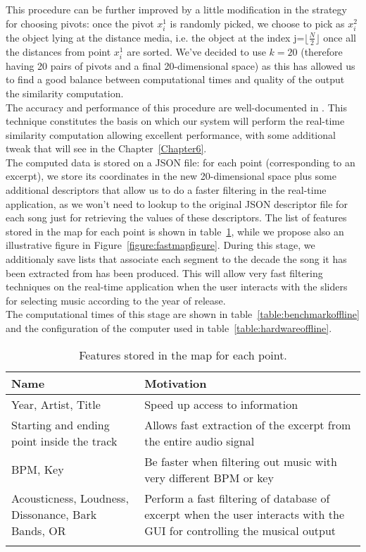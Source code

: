This procedure can be further improved by a little modification in the strategy for choosing pivots: once the pivot $x_i^1$ is randomly picked, we choose to pick as $x_i^2$ the object lying at the distance media, i.e. the object at the index j=$ \lfloor \frac{N}{2} \rfloor$ once all the distances from point $x_i^1$ are sorted. We've decided to use $k=20$ (therefore having 20 pairs of pivots and a final 20-dimensional space) as this has allowed us to find a good balance between computational times and quality of the output the similarity computation.\\
The accuracy and performance of this procedure are well-documented in \cite{fastmap12}. This technique constitutes the basis on which our system will perform the real-time similarity computation allowing excellent performance, with some additional tweak that will see in the Chapter~\ref{Chapter6}. \\
The computed data is stored on a JSON file: for each point (corresponding to an excerpt), we store its coordinates in the new 20-dimensional space plus some additional descriptors that allow us to do a faster filtering in the real-time application, as we won't need to lookup to the original JSON descriptor file for each song just for retrieving the values of these descriptors. The list of features stored in the map for each point is shown in table~\ref{table:fastmap}, while we propose also an illustrative figure in Figure~\ref{figure:fastmapfigure}. During this stage, we additionaly save lists that associate each segment to the decade the song it has been extracted from has been produced. This will allow very fast filtering techniques on the real-time application when the user interacts with the sliders for selecting music according to the year of release. \\The computational times of this stage are shown in table~\ref{table:benchmarkoffline} and the configuration of the computer used in table~\ref{table:hardwareoffline}.


\newpage
\begin{center}
\begin{longtable}{| p{} | p{} |} 
\hline
\textbf{Name} &  \textbf{Motivation} \\ \hline
Year, Artist, Title & Speed up access to information\\ \hline
Starting and ending point inside the track & Allows fast extraction of the excerpt from the entire audio signal \\ \hline
BPM, Key & Be faster when filtering out music with very different BPM or key\\ \hline
Acousticness, Loudness, Dissonance, Bark Bands, OR & Perform a fast filtering of database of excerpt when the user interacts with the GUI for controlling the musical output\\ \hline
\caption[Features stored in the map]{Features stored in the map for each point.}
\label{table:fastmap}
\end{longtable}
\end{center}

